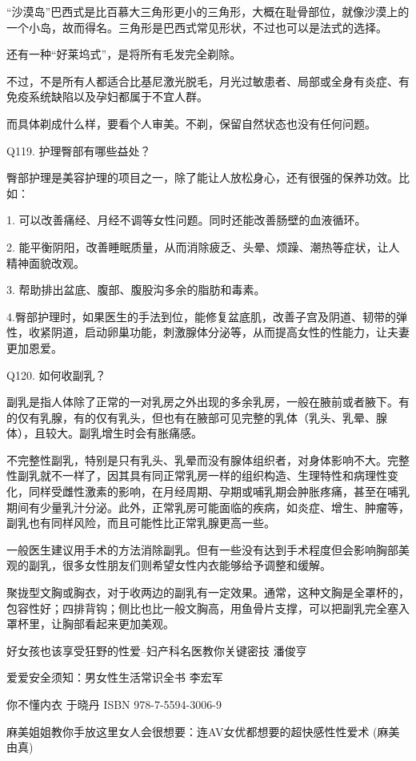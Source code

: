 \documentclass[12pt,UTF8]{ctexbook}
\begin{document}
“沙漠岛”巴西式是比百慕大三角形更小的三角形，大概在耻骨部位，就像沙漠上的一个小岛，故而得名。三角形是巴西式常见形状，不过也可以是法式的选择。

还有一种“好莱坞式”，是将所有毛发完全剃除。

不过，不是所有人都适合比基尼激光脱毛，月光过敏患者、局部或全身有炎症、有免疫系统缺陷以及孕妇都属于不宜人群。

而具体剃成什么样，要看个人审美。不剃，保留自然状态也没有任何问题。

Q119. 护理臀部有哪些益处？

臀部护理是美容护理的项目之一，除了能让人放松身心，还有很强的保养功效。比如：

1. 可以改善痛经、月经不调等女性问题。同时还能改善肠壁的血液循环。

2. 能平衡阴阳，改善睡眠质量，从而消除疲乏、头晕、烦躁、潮热等症状，让人精神面貌改观。

3. 帮助排出盆底、腹部、腹股沟多余的脂肪和毒素。

4.臀部护理时，如果医生的手法到位，能修复盆底肌，改善子宫及阴道、韧带的弹性，收紧阴道，启动卵巢功能，刺激腺体分泌等，从而提高女性的性能力，让夫妻更加恩爱。

Q120. 如何收副乳？

副乳是指人体除了正常的一对乳房之外出现的多余乳房，一般在腋前或者腋下。有的仅有乳腺，有的仅有乳头，但也有在腋部可见完整的乳体（乳头、乳晕、腺体），且较大。副乳增生时会有胀痛感。

不完整性副乳，特别是只有乳头、乳晕而没有腺体组织者，对身体影响不大。完整性副乳就不一样了，因其具有同正常乳房一样的组织构造、生理特性和病理性变化，同样受雌性激素的影响，在月经周期、孕期或哺乳期会肿胀疼痛，甚至在哺乳期间有少量乳汁分泌。此外，正常乳房可能面临的疾病，如炎症、增生、肿瘤等，副乳也有同样风险，而且可能性比正常乳腺更高一些。

一般医生建议用手术的方法消除副乳。但有一些没有达到手术程度但会影响胸部美观的副乳，很多女性朋友们则希望女性内衣能够给予调整和缓解。

聚拢型文胸或胸衣，对于收两边的副乳有一定效果。通常，这种文胸是全罩杯的，包容性好；四排背钩；侧比也比一般文胸高，用鱼骨片支撑，可以把副乳完全塞入罩杯里，让胸部看起来更加美观。



\backmatter

好女孩也该享受狂野的性爱--妇产科名医教你关键密技  潘俊亨

爱爱安全须知：男女性生活常识全书				 李宏军

你不懂内衣									 于晓丹	ISBN 978-7-5594-3006-9

麻美姐姐教你手放这里女人会很想要：连AV女优都想要的超快感性性爱术 (麻美由真)
\end{document}
